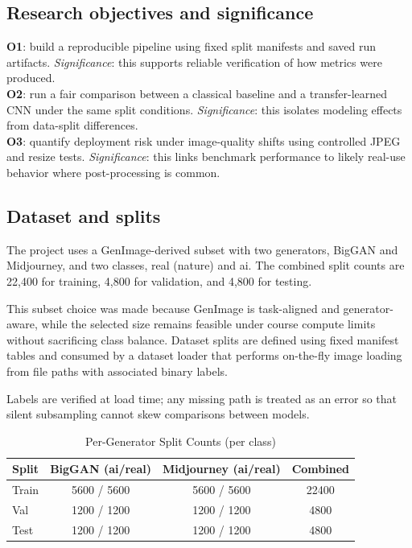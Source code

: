 \documentclass[conference]{IEEEtran}
\begin{document}
\subsection{Research objectives and significance}
\textbf{O1}: build a reproducible pipeline using fixed split manifests and saved run artifacts. \textit{Significance}: this supports reliable verification of how metrics were produced.\\
\textbf{O2}: run a fair comparison between a classical baseline and a transfer-learned CNN under the same split conditions. \textit{Significance}: this isolates modeling effects from data-split differences.\\
\textbf{O3}: quantify deployment risk under image-quality shifts using controlled JPEG and resize tests. \textit{Significance}: this links benchmark performance to likely real-use behavior where post-processing is common.

\subsection{Dataset and splits}
The project uses a GenImage-derived subset with two generators, BigGAN and Midjourney, and two classes, real (nature) and ai. The combined split counts are 22,400 for training, 4,800 for validation, and 4,800 for testing.

This subset choice was made because GenImage is task-aligned and generator-aware, while the selected size remains feasible under course compute limits without sacrificing class balance. Dataset splits are defined using fixed manifest tables and consumed by a dataset loader that performs on-the-fly image loading from file paths with associated binary labels.

Labels are verified at load time; any missing path is treated as an error so that silent subsampling cannot skew comparisons between models.

\begin{table}[htbp]
\caption{Per-Generator Split Counts (per class)}
\label{tab:split-counts}
\centering
\begin{tabular}{lccc}
\toprule
Split & BigGAN (ai/real) & Midjourney (ai/real) & Combined \\
\midrule
Train & 5600 / 5600 & 5600 / 5600 & 22400 \\
Val & 1200 / 1200 & 1200 / 1200 & 4800 \\
Test & 1200 / 1200 & 1200 / 1200 & 4800 \\
\bottomrule
\end{tabular}
\end{table}
\end{document}
